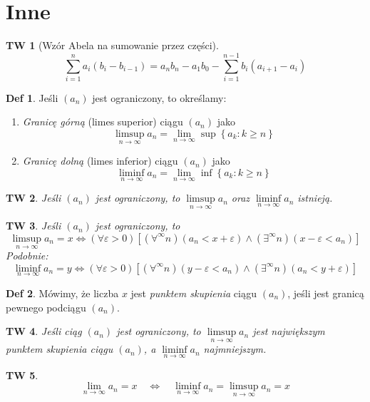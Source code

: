 \documentclass[a4paper, 12pt]{mwart}
\theoremstyle{definition}
\newtheorem{definicja}{Def}[section]
\theoremstyle{plain}
\newtheorem{twierdzenie}{TW}[section]
\theoremstyle{remark}
\begin{document}
\section{Inne}
\begin{twierdzenie}[Wzór Abela na sumowanie przez części]
	\begin{equation}
		\sum_{i = 1}^n a_i(b_i - b_{i-1}) = a_nb_n - a_1b_0 - \sum_{i = 1}^{n-1} b_i(a_{i+1} - a_i)
	\end{equation}
\end{twierdzenie}
\begin{definicja}
	Jeśli $(a_n)$ jest ograniczony, to określamy:
	\begin{enumerate}
		\item \emph{Granicę górną} (limes superior) ciągu $(a_n)$ jako
		\begin{equation}
			\limsup_{n\to\infty} a_n = \lim_{n \to\infty} \sup \left\{a_k : k \geq n\right\}
		\end{equation}
		\item \emph{Granicę dolną} (limes inferior) ciągu $(a_n)$ jako
		\begin{equation}
			\liminf_{n\to\infty} a_n = \lim_{n \to\infty} \inf \left\{a_k : k \geq n\right\}
		\end{equation} 
	\end{enumerate}
\end{definicja}
\begin{twierdzenie}
	Jeśli $(a_n)$ jest ograniczony, to $\limsup\limits_{n\to\infty} a_n$ oraz $ \liminf\limits_{n\to\infty} a_n$ istnieją.
\end{twierdzenie}
\begin{twierdzenie}
	Jeśli $(a_n)$ jest ograniczony, to
	\begin{equation}
		\limsup_{n\to\infty} a_n = x \iff (\forall \varepsilon >0)\left[(\forall^\infty n)(a_n < x + \varepsilon) \land (\exists^\infty n)(x - \varepsilon < a_n)\right]
	\end{equation}
	Podobnie:
	\begin{equation}
		\liminf_{n\to\infty} a_n = y \iff (\forall \varepsilon >0)\left[(\forall^\infty n)(y - \varepsilon < a_n) \land (\exists^\infty n)(a_n < y + \varepsilon)\right]
	\end{equation}
\end{twierdzenie}
\begin{definicja}
	Mówimy, że liczba $x$ jest \emph{punktem skupienia} ciągu $(a_n)$, jeśli jest granicą pewnego podciągu $(a_n)$.
\end{definicja}
\begin{twierdzenie}
	Jeśli ciąg $(a_n)$ jest ograniczony, to $\limsup\limits_{n\to\infty} a_n$ jest największym punktem skupienia ciągu $(a_n)$, a $ \liminf\limits_{n\to\infty} a_n$ najmniejszym.
\end{twierdzenie}

\begin{twierdzenie}
	\begin{equation}
		\lim_{n\to\infty} a_n = x \quad \iff \quad \liminf_{n\to\infty} a_n = \limsup_{n\to\infty} a_n = x
	\end{equation}
\end{twierdzenie}
\end{document}
